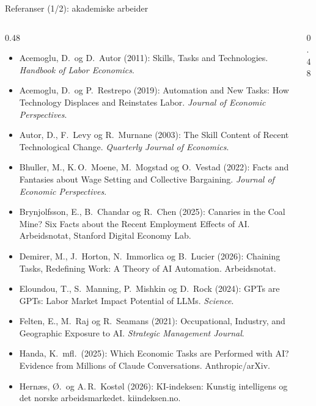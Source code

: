 
\begin{frame}{Referanser (1/2): akademiske arbeider}
\scriptsize
\begin{columns}[T,onlytextwidth]
\begin{column}{0.48\textwidth}
\begin{itemize}\setlength{\itemsep}{2pt}
  \item Acemoglu, D.\ og D.\ Autor (2011): Skills, Tasks and Technologies. \emph{Handbook of Labor Economics}.
  \item Acemoglu, D.\ og P.\ Restrepo (2019): Automation and New Tasks: How Technology Displaces and Reinstates Labor. \emph{Journal of Economic Perspectives}.
  \item Autor, D., F.\ Levy og R.\ Murnane (2003): The Skill Content of Recent Technological Change. \emph{Quarterly Journal of Economics}.
  \item Bhuller, M., K.\,O.\ Moene, M.\ Mogstad og O.\ Vestad (2022): Facts and Fantasies about Wage Setting and Collective Bargaining. \emph{Journal of Economic Perspectives}.
  \item Brynjolfsson, E., B.\ Chandar og R.\ Chen (2025): Canaries in the Coal Mine? Six Facts about the Recent Employment Effects of AI. Arbeidsnotat, Stanford Digital Economy Lab.
  \item Demirer, M., J.\ Horton, N.\ Immorlica og B.\ Lucier (2026): Chaining Tasks, Redefining Work: A Theory of AI Automation. Arbeidsnotat.
  \item Eloundou, T., S.\ Manning, P.\ Mishkin og D.\ Rock (2024): GPTs are GPTs: Labor Market Impact Potential of LLMs. \emph{Science}.
  \item Felten, E., M.\ Raj og R.\ Seamans (2021): Occupational, Industry, and Geographic Exposure to AI. \emph{Strategic Management Journal}.
  \item Handa, K.\ mfl.\ (2025): Which Economic Tasks are Performed with AI? Evidence from Millions of Claude Conversations. Anthropic/arXiv.
  \item Hernæs, Ø.\ og A.\,R.\ Kostøl (2026): KI-indeksen: Kunstig intelligens og det norske arbeidsmarkedet. kiindeksen.no.
\end{itemize}
\end{column}
\begin{column}{0.48\textwidth}
\begin{itemize}\setlength{\itemsep}{2pt}

\end{itemize}
\end{column}
\end{columns}
\end{frame}

